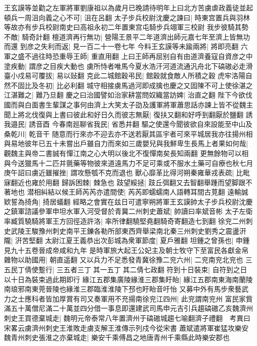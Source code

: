王玄謨等並勸之左軍將軍劉康祖以為歲月已晚請待明年上曰北方苦虜虐政義徒並起頓兵一周沮向義之心不可|{
	沮在呂翻}
太子步兵校尉沈慶之諫曰|{
	時東宫置兵與羽林等故亦有步兵校尉南史曰高祖永初二年置東宫屯騎步兵翊軍三校尉}
我步彼騎其勢不敵|{
	騎奇計翻}
檀道濟再行無功|{
	營陽王景平二年道濟出師元嘉七年至濟上皆無功而還}
到彦之失利而返|{
	見一百二十一卷七年}
今料王玄謨等未踰兩將|{
	將即亮翻}
六軍之盛不過往時恐重辱王師|{
	重直用翻}
上曰王師再屈别自有由道濟養寇自資彦之中塗疾動|{
	謂彦之目疾大動也}
虜所恃者唯馬今夏水浩汗河道流通汎舟北下碻磝必走滑臺小戍易可覆拔|{
	易以䜴翻}
克此二城館穀弔民|{
	館穀就食敵人所積之穀}
虎牢洛陽自然不固比及冬初|{
	比必利翻}
城守相接虜馬過河即成擒也慶之又固陳不可上使徐湛之江湛難之|{
	難乃旦翻}
慶之曰治國譬如治家耕當問奴織當訪婢|{
	治直之翻}
陛下今欲伐國而與白面書生輩謀之事何由濟上大笑太子劭及護軍將軍蕭思話亦諫上皆不從魏主聞上將北伐復與上書曰彼此和好日久而彼志無厭|{
	復扶又翻和好呼到翻厭於鹽翻}
誘我邉民|{
	誘音酉}
今春南廵聊省我民|{
	省悉井翻}
驅之使還今聞彼欲自來設能至中山及桑乾川|{
	乾音干}
随意而行來亦不迎去亦不送若厭其區宇者可來平城居我亦往揚州相與易地彼年已五十未嘗出戶雖自力而來如三歲嬰兒與我鮮卑生長馬上者果如何哉|{
	觀魏主與帝二書誠有憚江南之心大明以後北不復憚南矣長知兩翻}
更無餘物可以相與今送獵馬十二匹并氈藥等物彼來道遠馬力不足可乘或不服水土藥可自療也秋七月庚午詔曰虜近雖摧挫|{
	謂攻懸瓠不克而退也}
獸心靡革比得河朔秦雍華戎表疏|{
	比毗寐翻近也雍於用翻}
歸訴困棘|{
	棘急也}
跂望綏拯|{
	跂丘弭翻又去智翻舉踵而望脚跟不著地也}
潜相糾結以候王師芮芮亦遣間使|{
	芮芮即蠕蠕南人語轉耳間古莧翻}
遠輸誠欵誓為掎角|{
	掎居蟻翻}
經略之會實在兹日可遣寧朔將軍王玄謨帥太子步兵校尉沈慶之鎮軍諮議參軍申坦水軍入河受督於青冀二州刺史蕭斌|{
	帥讀曰率斌音彬}
太子左衛率臧質驍騎將軍王方回徑造許洛|{
	率所律翻驍堅堯翻騎奇寄翻造七到翻}
徐兖二州刺史武陵王駿豫州刺史南平王鑠各勒所部東西齊舉梁南北秦三州刺史劉秀之震盪汧隴|{
	汧苦堅翻}
太尉江夏王義恭出次彭城為衆軍節度|{
	夏戶雅翻}
坦鍾之曾孫也|{
	申鍾見九十五卷晉成帝咸和九年}
是時軍旅大起王公妃主及朝士牧守下至富民各獻金帛雜物以助國用|{
	朝直遥翻}
又以兵力不足悉發青冀徐豫二兖六州|{
	二兖南兖北兖也}
三五民丁倩使蹔行|{
	三五者三丁其一五丁其二倩七政翻}
符到十日裝束|{
	自符到之日以十日為裝束過此期即行}
緣江五郡集廣陵緣淮三郡集盱眙|{
	緣江五郡南東海南蘭陵南琅邪南東莞晉陵也緣淮三郡臨淮淮陵下邳也盱眙音吁怡}
又募中外有馬步衆藝武力之士應科者皆加厚賞有司又奏軍用不充揚南徐兖江四州|{
	此兖謂南兖州}
富民家貲滿五十萬僧尼滿二十萬並四分借一事息即還建武司馬申元吉引兵趨碻磝乙亥魏濟州刺史王買德棄城走|{
	魏明元帝泰常八年置濟州于碻磝城趨七喻翻濟子禮翻　考異曰宋畧云虜濟州刺史王淮敗走虜支解王淮傳示列戍今從宋書}
蕭斌遣將軍崔猛攻樂安魏青州刺史張淮之亦棄城走|{
	樂安千乘傅昌之地唐青州千乘縣此時樂安郡也}
